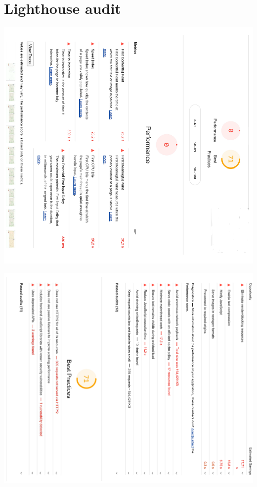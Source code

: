 \chapter{Lighthouse audit}\label{Audit}


\includegraphics[width=1.2\textwidth, angle=90]{Pictures/Audit1}

\includegraphics[width=1.2\textwidth, angle=90]{Pictures/Audit2}

